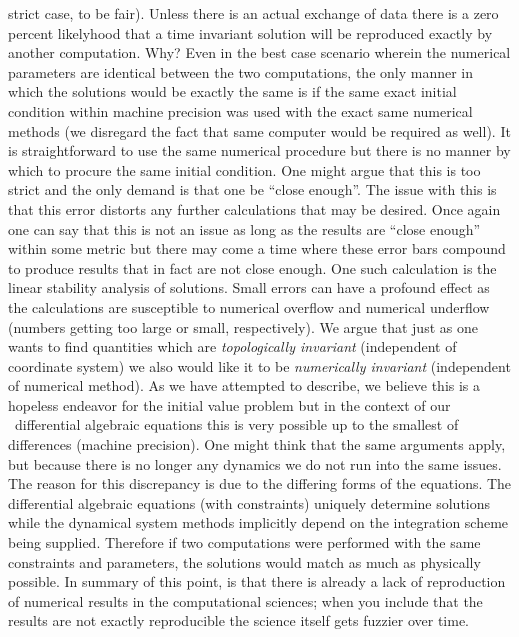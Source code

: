 strict case, to be fair).
Unless there
is an actual exchange of data there is a zero percent likelyhood
that a time invariant solution will be reproduced exactly by
another computation. Why? Even in the best case scenario wherein the
numerical parameters are identical between the two computations,
the only manner in which the solutions would be exactly the same
is if the same exact initial condition within machine
precision was used with the exact same
numerical methods (we disregard the fact that
same computer would be required as well).
It is straightforward to use the same numerical procedure but
there is no manner by which to procure the same initial condition.
One might argue that this is too strict and the only demand
is that one be ``close enough''. The issue with this
is that this error distorts any further calculations that
may be desired. Once again
one can say that this is not an issue as long as the results are
``close enough'' within some metric but there may come a time
where these error bars compound to produce results that in fact
are not close enough. One such calculation is the linear stability
analysis of solutions. Small errors can have a profound effect
as the calculations are susceptible to numerical overflow and
numerical underflow (numbers getting too large or small, respectively).
We argue that just as one wants to find
quantities which are \textit{topologically invariant} (independent
of coordinate system) we also would
like it to be \textit{numerically invariant}
(independent of numerical method). As we have attempted
to describe, we believe this is a hopeless endeavor
for the initial value problem
but in the context of our \spt\ differential algebraic equations
this is very possible up to the smallest of differences
(machine precision). One might think that the same arguments
apply, but because there is no longer any dynamics we do not
run into the same issues. The reason for this discrepancy is
due to the differing forms of the equations. The differential
algebraic equations (with constraints) uniquely determine solutions
while the dynamical system methods implicitly depend on
the integration scheme being supplied. Therefore if two
computations were performed with the same constraints and
parameters, the solutions would match as much as physically
possible.
In summary of this point, is that there
is already a lack of reproduction of numerical results
in the computational sciences; when you include that the
results are not exactly reproducible the science itself gets
fuzzier over time.

